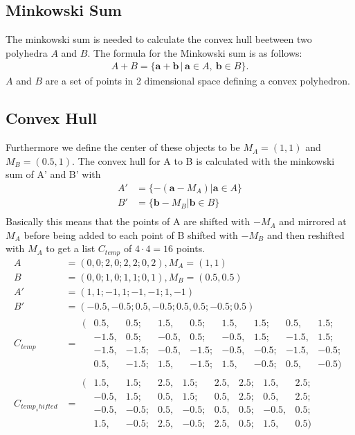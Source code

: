 \subsection{Minkowski Sum}
The minkowski sum is needed to calculate the convex hull beetween two polyhedra $A$ and $B$. The formula for the Minkowski sum is as follows:
\begin{align*}
 A + B = \{\mathbf{a}+\mathbf{b}\,|\,\mathbf{a}\in A,\ \mathbf{b}\in B\}. 
\end{align*}
$A$ and $B$ are a set of points in 2 dimensional space defining a convex polyhedron. 

\subsection{Convex Hull} %
Furthermore we define the center of these objects to be $M_A = (1,1)$ and $M_B = (0.5 , 1)$.
The convex hull for A to B is calculated with the minkowski sum of A' and B' with
\begin{align*}
A'  &= \{ -(\mathbf{a} - M_A) |\mathbf{a} \in A \}\\
B'  &= \{ \mathbf{b} - M_B |\mathbf{b} \in B \}\\
\end{align*}
Basically this means that the points of A are shifted with $-M_A$ and mirrored at $M_A$ before being added to each point of B shifted with $-M_B$ and then reshifted with $M_A$ to get a list $C_{temp}$ of $4\cdot 4 = 16$  points.
\begin{align*}
A &= 	( 0 , 0; 2 , 0; 2, 2; 0, 2), M_A =( 1, 1)\\
B &= (0, 0; 1, 0; 1, 1; 0, 1),  M_B =(0.5, 0.5)\\
A' &= (1, 1; -1, 1; -1, -1; 1, -1)\\
B' &= (-0.5, -0.5; 0.5, -0.5; 0.5, 0.5; -0.5; 0.5)\\
C_{temp} &=	\begin{matrix}
		(&0.5, &0.5; &1.5, &0.5; &1.5, &1.5; &0.5, &1.5;\\
		&-1.5, &0.5; &-0.5, &0.5; &-0.5, &1.5; &-1.5, &1.5;\\
		&-1.5, &-1.5; &-0.5, &-1.5; &-0.5, &-0.5; &-1.5, &-0.5;\\
		&0.5, &-1.5; &1.5, &-1.5; &1.5, &-0.5; &0.5, &-0.5)
		\end{matrix}\\
C_{temp_shifted} &= \begin{matrix}
		(&1.5, &1.5; &2.5, &1.5; &2.5, &2.5; &1.5, &2.5;\\
		&-0.5, &1.5; &0.5, &1.5; &0.5, &2.5; &0.5, &2.5;\\
		&-0.5, &-0.5; &0.5, &-0.5; &0.5, &0.5; &-0.5, &0.5;\\
		&1.5, &-0.5; &2.5, &-0.5; &2.5, &0.5; &1.5, &0.5)
		\end{matrix}\\
\end{align*}
